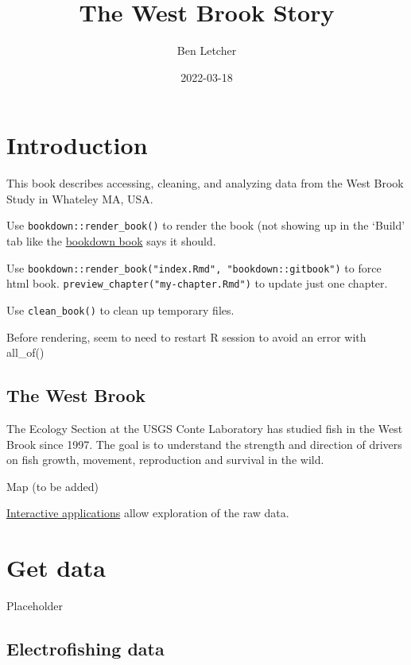 \documentclass[
]{book}
\title{The West Brook Story}
\author{Ben Letcher}
\date{2022-03-18}
\begin{document}
\maketitle

{
\setcounter{tocdepth}{1}
\tableofcontents
}
\hypertarget{introduction}{%
\chapter{Introduction}\label{introduction}}

This book describes accessing, cleaning, and analyzing data from the West Brook Study in Whateley MA, USA.

Use \texttt{bookdown::render\_book()} to render the book (not showing up in the `Build' tab like the \href{https://bookdown.org/yihui/bookdown/usage.html}{bookdown book} says it should.

Use \texttt{bookdown::render\_book("index.Rmd",\ "bookdown::gitbook")} to force html book. \texttt{preview\_chapter("my-chapter.Rmd")} to update just one chapter.

Use \texttt{clean\_book()} to clean up temporary files.

Before rendering, seem to need to restart R session to avoid an error with all\_of()

\hypertarget{the-west-brook}{%
\section{The West Brook}\label{the-west-brook}}

The Ecology Section at the USGS Conte Laboratory has studied fish in the West Brook since 1997. The goal is to understand the strength and direction of drivers on fish growth, movement, reproduction and survival in the wild.

Map (to be added)

\href{https://pitdata.ecosheds.org/}{Interactive applications} allow exploration of the raw data.

\hypertarget{getData}{%
\chapter{Get data}\label{getData}}

Placeholder

\hypertarget{dataElectro}{%
\section{Electrofishing data}\label{dataElectro}}
\end{document}

